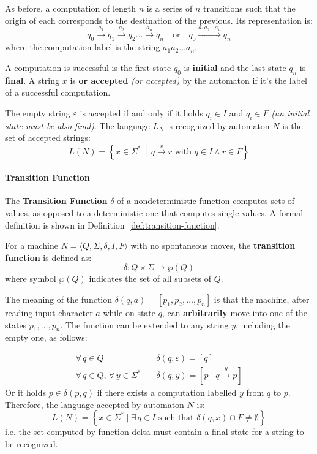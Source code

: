 \documentclass[english]{article}
\begin{document}
As before, a computation of length \(n\) is a series of \(n\) transitions such that the origin of each corresponds to the destination of the previous. Its representation is:
\[ q_0 \xrightarrow{a_1} q_1 \xrightarrow{a_2} q_2 \ldots \xrightarrow{a_n} q_n \quad \text{or} \quad q_0 \xrightarrow{a_1 a_2 \ldots a_n} q_n \]
where the computation label is the string \(a_1 a_2 \ldots a_n\).

A computation is successful is the first state \(q_0\) is \textbf{initial} and the last state \(q_n\) is \textbf{final}.
A string \(x\) is \textbf{or accepted} \textit{(or accepted)} by the automaton if it's the label of a successful computation.

The empty string \(\varepsilon\) is accepted if and only if it holds \(q_i \in I\) and \(q_i \in F\) \textit{(an initial state must be also final)}.
The language \(L_N\) is recognized by automaton \(N\) is the set of accepted strings:
\[ L(N) = \left\{ x \in \Sigma^\ast \, \middle\vert \, q \xrightarrow{x} r \text{ with } q \in I \land r \in F \right\} \]

\paragraph{Transition Function}

The \textbf{Transition Function} \(\delta\) of a nondeterministic function computes sets of values, as opposed to a deterministic one that computes single values.
A formal definition is shown in Definition~\ref{def:transition-function}.

\begin{definition}
  \label{def:transition-function}
  For a machine \(N = \langle Q, \Sigma, \delta, I, F \rangle\) with no spontaneous moves, the \textbf{transition function} is defined as:
  \[ \delta : Q \times \Sigma \rightarrow \wp(Q) \]
  where symbol \(\wp(Q)\) indicates the set of all subsets of \(Q\).
\end{definition}

The meaning of the function \(\delta(q, a) = \left[ p_1, p_2, \ldots, p_n \right]\) is that the machine, after reading input character \(a\) while on state \(q\), can \textbf{arbitrarily} move into one of the states \(p_1, \ldots, p_n\).
The function can be extended to any string \(y\), including the empty one, as follows:

\begin{align*}
  \forall \, q \in Q \quad                                  & \delta(q, \varepsilon) = \left[ q \right]                \\
  \forall \, q \in Q, \, \forall \, y \in \Sigma^\ast \quad & \delta(q, y) = \left[ p \mid q \xrightarrow{y} p \right]
\end{align*}
Or it holds \(p \in \delta(p, q)\) if there exists a computation labelled \(y\) from \(q\) to \(p\).
Therefore, the language accepted by automaton \(N\) is:
\[ L(N) = \left\{ x \in \Sigma^\ast \mid \exists \, q \in I \text{ such that } \delta(q, x) \cap F \neq \emptyset \right\} \]
i.e. the set computed by function delta must contain a final state for a string to be recognized.
\end{document}
